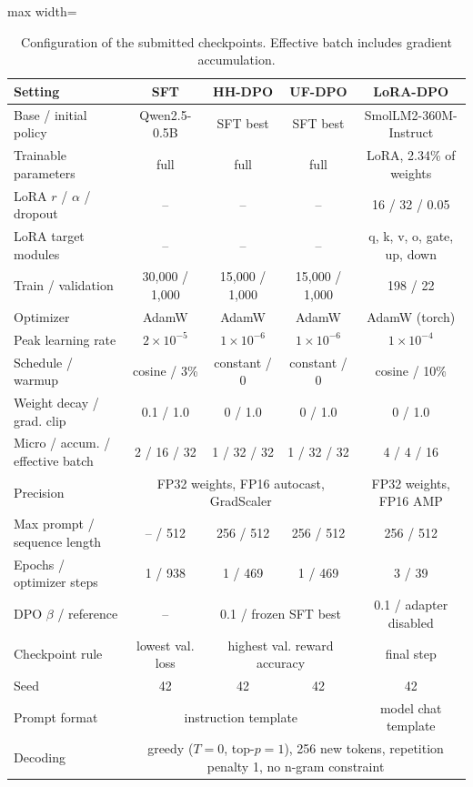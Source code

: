 \documentclass{article}
\newcommand{\pct}{\%\xspace}
\begin{document}
\begin{table}[htbp]
\centering
\caption{Configuration of the submitted checkpoints. Effective batch includes gradient accumulation.}
\label{tab:config}
\scriptsize
\begin{adjustbox}{max width=\linewidth}
\begin{tabular}{lcccc}
\toprule
Setting & SFT & HH-DPO & UF-DPO & LoRA-DPO \\
\midrule
Base / initial policy & Qwen2.5-0.5B & SFT best & SFT best & SmolLM2-360M-Instruct \\
Trainable parameters & full & full & full & LoRA, 2.34\pct of weights \\
LoRA $r$ / $\alpha$ / dropout & -- & -- & -- & 16 / 32 / 0.05 \\
LoRA target modules & -- & -- & -- & q, k, v, o, gate, up, down \\
Train / validation & 30,000 / 1,000 & 15,000 / 1,000 & 15,000 / 1,000 & 198 / 22 \\
Optimizer & AdamW & AdamW & AdamW & AdamW (torch) \\
Peak learning rate & $2\!\times\!10^{-5}$ & $1\!\times\!10^{-6}$ & $1\!\times\!10^{-6}$ & $1\!\times\!10^{-4}$ \\
Schedule / warmup & cosine / 3\pct & constant / 0 & constant / 0 & cosine / 10\pct \\
Weight decay / grad. clip & 0.1 / 1.0 & 0 / 1.0 & 0 / 1.0 & 0 / 1.0 \\
Micro / accum. / effective batch & 2 / 16 / 32 & 1 / 32 / 32 & 1 / 32 / 32 & 4 / 4 / 16 \\
Precision & \multicolumn{3}{c}{FP32 weights, FP16 autocast, GradScaler} & FP32 weights, FP16 AMP \\
Max prompt / sequence length & -- / 512 & 256 / 512 & 256 / 512 & 256 / 512 \\
Epochs / optimizer steps & 1 / 938 & 1 / 469 & 1 / 469 & 3 / 39 \\
DPO $\beta$ / reference & -- & \multicolumn{2}{c}{0.1 / frozen SFT best} & 0.1 / adapter disabled \\
Checkpoint rule & lowest val. loss & \multicolumn{2}{c}{highest val. reward accuracy} & final step \\
Seed & 42 & 42 & 42 & 42 \\
\midrule
Prompt format & \multicolumn{3}{c}{instruction template} & model chat template \\
Decoding & \multicolumn{4}{c}{greedy ($T=0$, top-$p=1$), 256 new tokens, repetition penalty 1, no n-gram constraint} \\
\bottomrule
\end{tabular}
\end{adjustbox}
\end{table}
\end{document}
